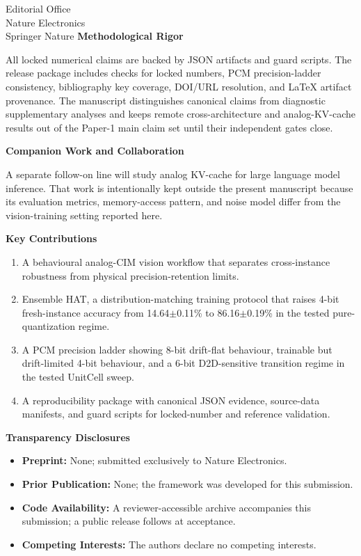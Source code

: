 \documentclass[11pt,a4paper]{letter}
\begin{document}
\begin{letter}{Editorial Office\\Nature Electronics\\Springer Nature}
\vspace{0.5em}
\textbf{Methodological Rigor}

All locked numerical claims are backed by JSON artifacts and guard scripts. The release package includes checks for locked numbers, PCM precision-ladder consistency, bibliography key coverage, DOI/URL resolution, and LaTeX artifact provenance. The manuscript distinguishes canonical claims from diagnostic supplementary analyses and keeps remote cross-architecture and analog-KV-cache results out of the Paper-1 main claim set until their independent gates close.

\vspace{0.5em}
\textbf{Companion Work and Collaboration}

A separate follow-on line will study analog KV-cache for large language model inference. That work is intentionally kept outside the present manuscript because its evaluation metrics, memory-access pattern, and noise model differ from the vision-training setting reported here.

\vspace{0.5em}
\textbf{Key Contributions}

\begin{enumerate}
    \item A behavioural analog-CIM vision workflow that separates cross-instance robustness from physical precision-retention limits.
    \item Ensemble HAT, a distribution-matching training protocol that raises 4-bit fresh-instance accuracy from 14.64$\pm$0.11\% to 86.16$\pm$0.19\% in the tested pure-quantization regime.
    \item A PCM precision ladder showing 8-bit drift-flat behaviour, trainable but drift-limited 4-bit behaviour, and a 6-bit D2D-sensitive transition regime in the tested UnitCell sweep.
    \item A reproducibility package with canonical JSON evidence, source-data manifests, and guard scripts for locked-number and reference validation.
\end{enumerate}

\vspace{0.5em}
\textbf{Transparency Disclosures}

\begin{itemize}
    \item \textbf{Preprint:} None; submitted exclusively to Nature Electronics.
    \item \textbf{Prior Publication:} None; the framework was developed for this submission.
    \item \textbf{Code Availability:} A reviewer-accessible archive accompanies this submission; a public release follows at acceptance.
    \item \textbf{Competing Interests:} The authors declare no competing interests.
\end{itemize}


\end{letter}
\end{document}
